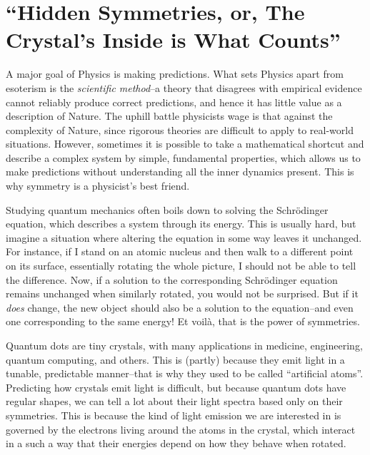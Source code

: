 
\section*{``Hidden Symmetries, or, The Crystal's Inside is What Counts''}
\thispagestyle{empty}

A major goal of Physics is making predictions. What sets Physics apart from esoterism is the \textit{scientific method}--a theory that disagrees with empirical evidence cannot reliably produce correct predictions, and hence it has little value as a description of Nature. The uphill battle physicists wage is that against the complexity of Nature, since rigorous theories are difficult to apply to real-world situations. However, sometimes it is possible to take a mathematical shortcut and describe a complex system by simple, fundamental properties, which allows us to make predictions without understanding all the inner dynamics present. This is why symmetry is a physicist's best friend.

Studying quantum mechanics often boils down to solving the Schrödinger equation, which describes a system through its energy. This is usually hard, but imagine a situation where altering the equation in some way leaves it unchanged. For instance, if I stand on an atomic nucleus and then walk to a different point on its surface, essentially rotating the whole picture, I should not be able to tell the difference. Now, if a solution to the corresponding Schrödinger equation remains unchanged when similarly rotated, you would not be surprised. But if it \textit{does} change, the new object should also be a solution to the equation--and even one corresponding to the same energy! Et voilà, that is the power of symmetries.

Quantum dots are tiny crystals, with many applications in medicine, engineering, quantum computing, and others. This is (partly) because they emit light in a tunable, predictable manner--that is why they used to be called ``artificial atoms''. Predicting how crystals emit light is difficult, but because quantum dots have regular shapes, we can tell a lot about their light spectra based only on their symmetries. This is because the kind of light emission we are interested in is governed by the electrons living around the atoms in the crystal, which interact in a such a way that their energies depend on how they behave when rotated.


